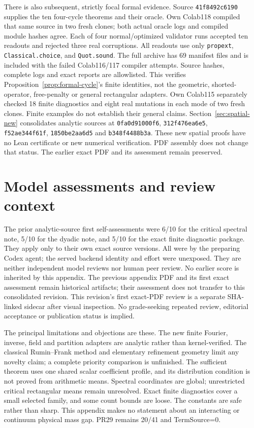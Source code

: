 \documentclass[11pt]{article}
\begin{document}
There is also subsequent, strictly focal formal evidence. Source
\texttt{41f8492c6190} supplies the ten four-cycle theorems and their oracle.
Own Colab118 compiled that same source in two fresh clones; both actual oracle logs
and compiled module hashes agree. Each of four normal/optimized validator runs
accepted ten readouts and rejected three real corruptions. All readouts use only
\texttt{propext}, \texttt{Classical.choice}, and \texttt{Quot.sound}.
The full archive has 69 manifest files and is included with the failed Colab116/117
compiler attempts. Source hashes, complete logs and exact reports are allowlisted.
This verifies Proposition~\ref{prop:formal-cycle}'s finite identities, not the
geometric, shorted-operator, free-penalty or general rectangular adapters.
Own Colab115 separately checked 18 finite diagnostics and eight real mutations in
each mode of two fresh clones. Finite examples do not establish their general claims.
Section~\ref{sec:spatial-new} consolidates analytic sources at
\texttt{0fa0d91000f6}, \texttt{312f476ea6e5}, \texttt{f52ae344f61f},
\texttt{1850be2aa6d5} and \texttt{b348f4488b3a}. These new spatial proofs
have no Lean certificate or new numerical verification. PDF assembly does not
change that status. The earlier exact PDF and its assessment remain preserved.

\section{Model assessments and review context}
The prior analytic-source first self-assessments were 6/10 for the critical spectral
note, 5/10 for the dyadic note, and 5/10 for the exact finite diagnostic package.
They apply only to their own exact source versions. All were by the preparing Codex
agent; the served backend identity and effort were unexposed. They are neither independent
model reviews nor human peer review. No earlier score is inherited by this appendix.
The previous appendix PDF and its first exact assessment remain historical artifacts;
their assessment does not transfer to this consolidated revision. This revision's
first exact-PDF review is a separate SHA-linked sidecar after visual inspection.
No grade-seeking repeated review,
editorial acceptance or publication status is implied.

The principal limitations and objections are these. The new finite Fourier, inverse,
field and partition adapters are analytic rather than kernel-verified. The classical
Rumin--Frank method and elementary refinement geometry limit any novelty claim; a
complete priority comparison is unfinished. The sufficient theorem uses one shared
scalar coefficient profile, and its distribution condition is not proved from arithmetic
means. Spectral coordinates are global; unrestricted critical rectangular means remain
unresolved. Exact finite diagnostics cover a small selected family, and some count bounds
are loose. The constants are safe rather than sharp. This appendix makes no statement
about an interacting or continuum physical mass gap. PR29 remains 20/41 and TermSource=0.
\end{document}
